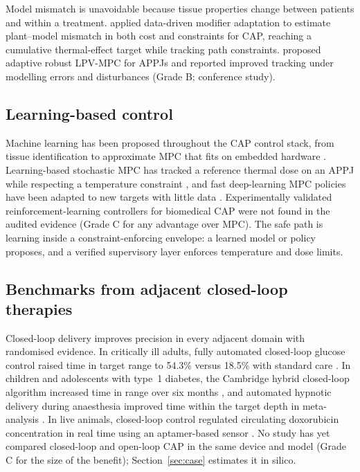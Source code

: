 \documentclass[preprint,review,12pt,authoryear]{elsarticle}
\begin{document}
Model mismatch is unavoidable because tissue properties change between patients and within a treatment. \citet{rodrigues2023} applied data-driven modifier adaptation to estimate plant--model mismatch in both cost and constraints for CAP, reaching a cumulative thermal-effect target while tracking path constraints. \citet{ghafghanbari2024} proposed adaptive robust LPV-MPC for APPJs and reported improved tracking under modelling errors and disturbances (Grade B; conference study).

\subsection{Learning-based control}

Machine learning has been proposed throughout the CAP control stack, from tissue identification to approximate MPC that fits on embedded hardware \citep{bonzanini2022}. Learning-based stochastic MPC has tracked a reference thermal dose on an APPJ while respecting a temperature constraint \citep{bonzanini2021}, and fast deep-learning MPC policies have been adapted to new targets with little data \citep{chan2023}. Experimentally validated reinforcement-learning controllers for biomedical CAP were not found in the audited evidence (Grade C for any advantage over MPC). The safe path is learning inside a constraint-enforcing envelope: a learned model or policy proposes, and a verified supervisory layer enforces temperature and dose limits.

\subsection{Benchmarks from adjacent closed-loop therapies}

Closed-loop delivery improves precision in every adjacent domain with randomised evidence. In critically ill adults, fully automated closed-loop glucose control raised time in target range to 54.3\% versus 18.5\% with standard care \citep{leelarathna2013}. In children and adolescents with type~1 diabetes, the Cambridge hybrid closed-loop algorithm increased time in range over six months \citep{ware2022}, and automated hypnotic delivery during anaesthesia improved time within the target depth in meta-analysis \citep{felippe2026}. In live animals, closed-loop control regulated circulating doxorubicin concentration in real time using an aptamer-based sensor \citep{mage2017}. No study has yet compared closed-loop and open-loop CAP in the same device and model (Grade C for the size of the benefit); Section~\ref{sec:case} estimates it in silico.
\end{document}
